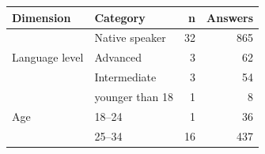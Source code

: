 \documentclass[thesis]{cluu}
\providecommand{\DIFaddbeginFL}{} %
\providecommand{\DIFdelbeginFL}{} %
\providecommand{\DIFdelendFL}{} %
\begin{document}
\begin{table}[H]
\centering
\DIFdelbeginFL %
\DIFdelendFL \DIFaddbeginFL \begin{tabular}{llrr}
\toprule
\textbf{Dimension} & \textbf{Category} & \textbf{n} & \textbf{Answers} \\
\midrule
\multirow{3}{*}{Language level}
  & Native speaker & 32 & 865 \\
  & Advanced       & 3  & 62  \\
  & Intermediate   & 3  & 54  \\
\midrule
\multirow{6}{*}{Age}
  & younger than 18 & 1  & 8   \\
  & 18--24          & 1  & 36  \\
  & 25--34          & 16 & 437 \\

\end{tabular}
\end{table}
\end{document}
